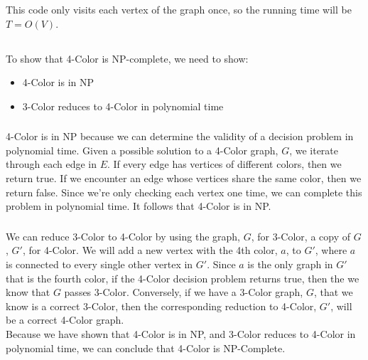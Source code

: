 \documentclass{article}
\begin{document}
This code only visits each vertex of the graph once, so the running time will be $T = O(V)$.

\subsection{}

To show that 4-Color is NP-complete, we need to show:

\begin{itemize}
    \item 4-Color is in NP
    \item 3-Color reduces to 4-Color in polynomial time
\end{itemize}

\subsubsection{}

4-Color is in NP because we can determine the validity of a decision problem in polynomial time.  Given a possible solution to a 4-Color graph, $G$, we iterate through each edge in $E$.  If every edge has vertices of different colors, then we return true.  If we encounter an edge whose vertices share the same color, then we return false.  Since we're only checking each vertex one time, we can complete this problem in polynomial time.  It follows that 4-Color is in NP.

\subsubsection{}

We can reduce 3-Color to 4-Color by using the graph, $G$, for 3-Color, a copy of $G$, $G'$, for 4-Color.  We will add a new vertex with the 4th color, $a$, to $G'$, where $a$ is connected to every single other vertex in $G'$.  Since $a$ is the only graph in $G'$ that is the fourth color, if the 4-Color decision problem returns true, then the we know that $G$ passes 3-Color.  Conversely, if we have a 3-Color graph, $G$, that we know is a correct 3-Color, then the corresponding reduction to 4-Color, $G'$, will be a correct 4-Color graph.\\

Because we have shown that 4-Color is in NP, and 3-Color reduces to 4-Color in polynomial time, we can conclude that 4-Color is NP-Complete.
\end{document}
